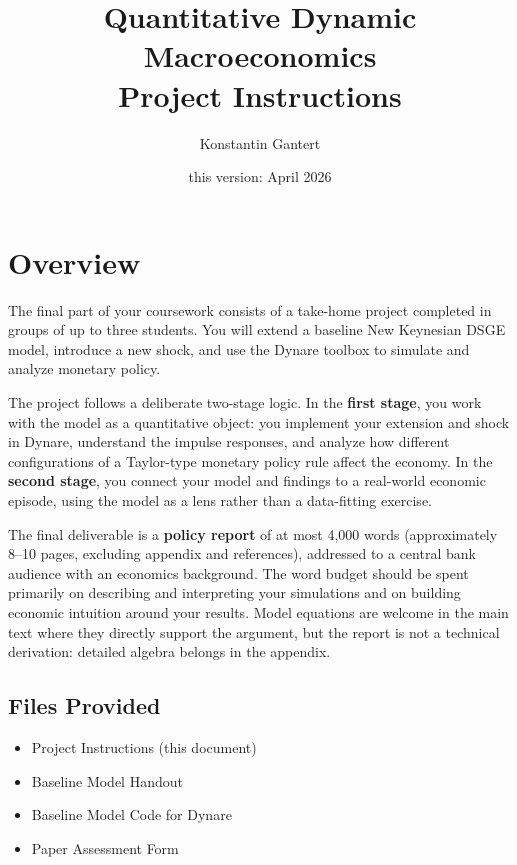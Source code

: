 \documentclass[11pt, a4paper]{article}
\title{\textbf{Quantitative Dynamic Macroeconomics}\\[0.4em]
\large Project Instructions}
\author{Konstantin Gantert}
\date{this version: April 2026}
\begin{document}
\maketitle
\tableofcontents
\bigskip

\section{Overview}

The final part of your coursework consists of a take-home project completed in
groups of up to three students. You will extend a baseline New Keynesian DSGE
model, introduce a new shock, and use the Dynare toolbox to simulate and analyze
monetary policy.

The project follows a deliberate two-stage logic. In the \textbf{first stage},
you work with the model as a quantitative object: you implement your extension
and shock in Dynare, understand the impulse responses, and analyze how different
configurations of a Taylor-type monetary policy rule affect the economy. In the
\textbf{second stage}, you connect your model and findings to a real-world
economic episode, using the model as a lens rather than a data-fitting exercise.

The final deliverable is a \textbf{policy report} of at most 4,000 words
(approximately 8--10 pages, excluding appendix and references), addressed to a
central bank audience with an economics background. The word budget should be
spent primarily on describing and interpreting your simulations and on building
economic intuition around your results. Model equations are welcome in the main
text where they directly support the argument, but the report is not a technical
derivation: detailed algebra belongs in the appendix.

\subsection*{Files Provided}

\begin{itemize}[noitemsep]
    \item Project Instructions (this document)
    \item Baseline Model Handout
    \item Baseline Model Code for Dynare
    \item Paper Assessment Form
\end{itemize}
\end{document}
